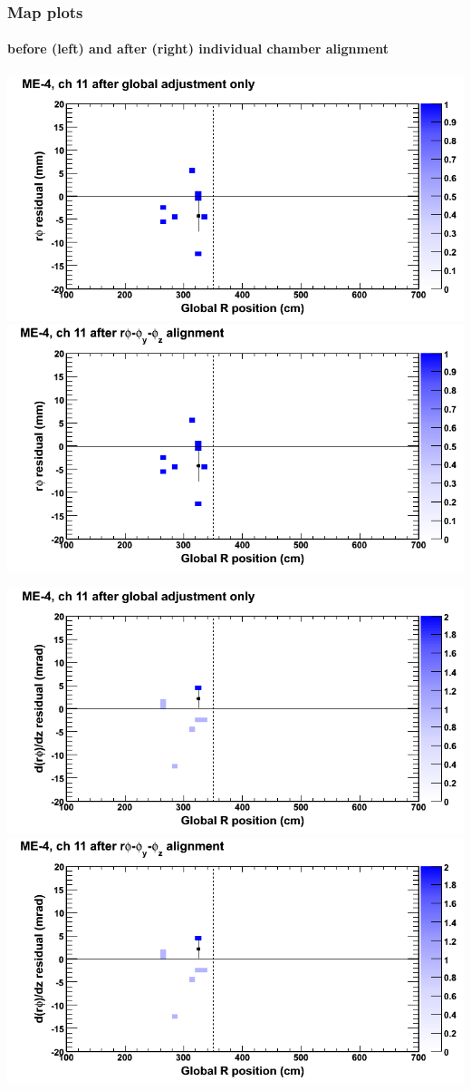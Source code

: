 \documentclass[compress]{beamer}
\begin{document}
\begin{frame}
\frametitle{Map plots}
\framesubtitle{before (left) and after (right) individual chamber alignment}
\includegraphics[width=0.5\linewidth]{ringmapplots_3dof/before_CSCvsr_mem4ch11_x.png} \includegraphics[width=0.5\linewidth]{ringmapplots_3dof/after_CSCvsr_mem4ch11_x.png}

\includegraphics[width=0.5\linewidth]{ringmapplots_3dof/before_CSCvsr_mem4ch11_dxdz.png} \includegraphics[width=0.5\linewidth]{ringmapplots_3dof/after_CSCvsr_mem4ch11_dxdz.png}
\end{frame}
\end{document}
